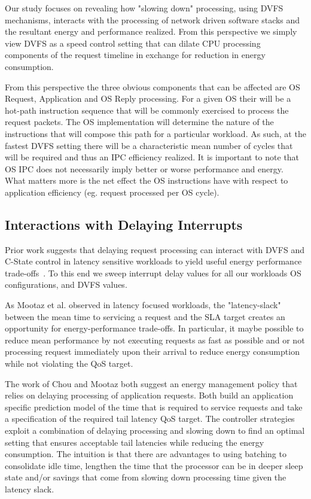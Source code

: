 Our study focuses on revealing how "slowing down" processing, using DVFS mechanisms, interacts with the processing of network driven software stacks and the resultant energy and performance realized. From this perspective we simply view DVFS as a speed control setting that can dilate CPU processing components of the request timeline in exchange for reduction in energy consumption.

From this perspective the three obvious components that can be affected are OS Request, Application and OS Reply processing. For a given OS their will be a hot-path instruction sequence that will be commonly exercised to process the request packets.  The OS implementation will determine the nature of the instructions that will compose this path for a particular workload.  As such, at the fastest DVFS setting there will be a characteristic mean number of cycles that will be required and thus an IPC efficiency realized.  It is important to note that OS IPC does not necessarily imply better or worse performance and energy. What matters more is the net effect the OS instructions have with respect to application efficiency (eg. request processed per OS cycle). %








\subsection{Interactions with Delaying Interrupts}

Prior work suggests that delaying request processing can interact with DVFS and C-State control in latency sensitive workloads to yield useful energy performance trade-offs~\cite{mootaz, chou}. To this end we sweep interrupt delay values for all our workloads OS configurations, and DVFS values.

As Mootaz et al.\cite{mootaz} observed in latency focused workloads, the "latency-slack" between the mean time to servicing a request and the SLA target creates an opportunity for energy-performance trade-offs.  In particular, it maybe possible to reduce mean performance by not executing requests as fast as possible and or not processing request immediately upon their arrival to reduce energy consumption while not violating the QoS target.  

The work of Chou and Mootaz both suggest an energy management policy that relies on delaying processing of application requests. Both build an application specific prediction model of the time that is required to service requests and take a specification of the required tail latency QoS target. The  controller strategies exploit a combination of delaying processing and slowing down to find an optimal setting that ensures acceptable tail latencies while reducing the energy consumption.  The intuition is that there are advantages to using batching to consolidate idle time, lengthen the time that the processor can be in deeper sleep state and/or savings that come from slowing down processing time given the latency slack.    

